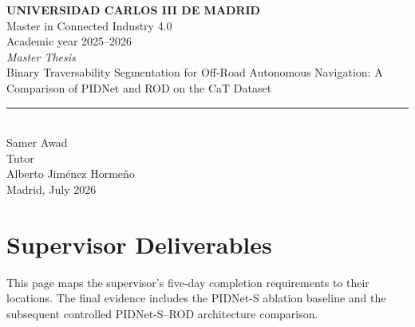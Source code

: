 \documentclass[12pt,a4paper]{report}
\newcommand{\MasterDegree}{Master in Connected Industry 4.0}
\newcommand{\ThesisAuthor}{Samer Awad}
\newcommand{\ThesisTutor}{Alberto Jiménez Hormeño}
\newcommand{\AcademicYear}{2025--2026}
\newcommand{\SubmissionPlaceDate}{Madrid, July 2026}
\newcommand{\ThesisTitle}{Binary Traversability Segmentation for Off-Road Autonomous Navigation: A Comparison of PIDNet and ROD on the CaT Dataset}
\begin{document}

\begin{titlepage}
  \begin{sffamily}
  \color{azulUC3M}
  \begin{center}
    {\Large\bfseries UNIVERSIDAD CARLOS III DE MADRID}\\[0.35cm]
    {\large \MasterDegree}\\
    {\large Academic year \AcademicYear}\\[2.2cm]

    {\Large\itshape Master Thesis}\\[0.8cm]
    {\Huge \ThesisTitle}\\[0.5cm]
    \rule{10.5cm}{0.1mm}\\[0.9cm]

    {\LARGE \ThesisAuthor}\\[1.2cm]
    {\Large Tutor}\\[0.2cm]
    {\Large \ThesisTutor}\\[0.35cm]
    {\Large \SubmissionPlaceDate}
  \end{center}

  \vfill
  \end{sffamily}
\end{titlepage}

\clearpage

\chapter*{Supervisor Deliverables}

This page maps the supervisor's five-day completion requirements to their
locations. The final evidence includes the PIDNet-S ablation baseline and the
subsequent controlled PIDNet-S--ROD architecture comparison.
\end{document}
